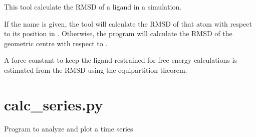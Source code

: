 \documentclass[letterpaper,10pt,english]{sphinxmanual}
\begin{document}

This tool calculate the RMSD of a ligand in a simulation.

If the  name is given, the tool will calculate the RMSD of that atom with respect to its position in . Otherwise, the program will calculate the RMSD of the geometric centre with respect to .

A force constant to keep the ligand restrained for free energy calculations is estimated from the RMSD using the equipartition theorem.


\section{calc\_series.py}
\label{\detokenize{tools:calc-series-py}}

Program to analyze and plot a time series


%
\begin{sphinxVerbatim}[commandchars=\\\{\}]
  \PYG{p}{[}\PYG{p}{]} \PYG{p}{[}  \PYG{p}{[} \PYG{p}{]}\PYG{p}{]} \PYG{p}{[} \PYG{p}{]}
                      \PYG{p}{[}  \PYG{p}{[} \PYG{p}{]}\PYG{p}{]}
                      \PYG{p}{[} \PYG{p}{]}
                      \PYG{p}{[} \PYG{p}{]} \PYG{p}{[} \PYG{p}{]} \PYG{p}{[}\PYG{p}{]}
                      \PYG{p}{[} \PYG{p}{]}
\end{sphinxVerbatim}
\end{document}
